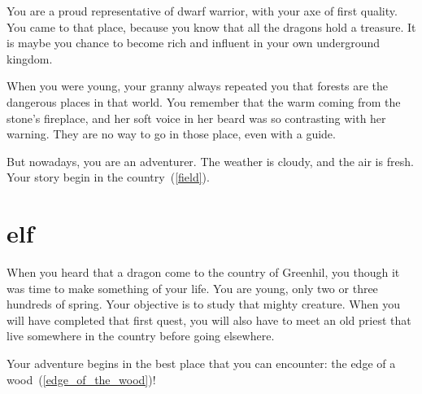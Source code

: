 You are a proud representative of dwarf warrior, with your axe of first
quality. You came to that place, because you know that all the dragons hold a
treasure. It is maybe you chance to become rich and influent in your own
underground kingdom.

When you were young, your granny always repeated you that forests are the
dangerous places in that world. You remember that the warm coming from the
stone's fireplace, and her soft voice in her beard was so contrasting with her
warning. They are no way to go in those place, even with a guide.

But nowadays, you are an adventurer. The weather is cloudy, and the air is
fresh. Your story begin in the country~(\ref{field}).

\section{elf}

When you heard that a dragon come to the country of Greenhil, you though it was
time to make something of your life. You are young, only two or three hundreds
of spring. Your objective is to study that mighty creature. When you will have
completed that first quest, you will also have to meet an old priest that live
somewhere in the country before going elsewhere.

Your adventure begins in the best place that you can encounter: the edge of a
wood~(\ref{edge_of_the_wood})!
